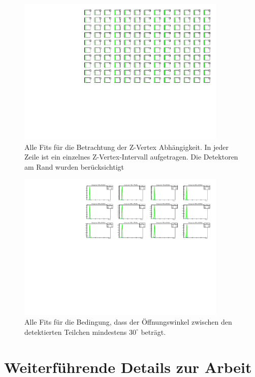 \documentclass[a4paper,11pt,oneside,final,german,openbib,pdftex]{scrbook}
\begin{document}
{\begin{appendix}
\begin{figure}[h!]
	\begin{center}
		\includegraphics[width=100mm]{20171804ZVertexAllFits}
		\caption{Alle Fits f\"ur die Betrachtung der Z-Vertex Abh\"angigkeit. In jeder Zeile ist ein einzelnes Z-Vertex-Intervall aufgetragen. Die Detektoren am Rand wurden ber\"ucksichtigt}
		\label{fig:ZVertex-All-Fits}
	\end{center}
\end{figure}

\begin{figure}
	\begin{center}
		\includegraphics[width=100mm]{20171804MinOpeningAngleAllFits}
		\caption{Alle Fits f\"ur die Bedingung, dass der \"Offnungswinkel zwischen den detektierten Teilchen mindestens $30^{\circ}$ betr\"agt.}
		\label{fig:Relative-Abweichung-Min-Opening-Angle-AllFits}
	\end{center}
\end{figure}


\section{Weiterf\"uhrende Details zur Arbeit}


\end{appendix}}
\end{document}
